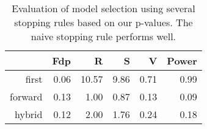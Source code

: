 \begin{table}[ht]
\centering
\begin{tabular}{rrrrrr}
  \hline
 & Fdp & R & S & V & Power \\ 
  \hline
first & 0.06 & 10.57 & 9.86 & 0.71 & 0.99 \\ 
  forward & 0.13 & 1.00 & 0.87 & 0.13 & 0.09 \\ 
  hybrid & 0.12 & 2.00 & 1.76 & 0.24 & 0.18 \\ 
   \hline
\end{tabular}
\caption{Evaluation of model selection using several stopping rules based on our p-values. The naive stopping rule performs well.} 
\end{table}

